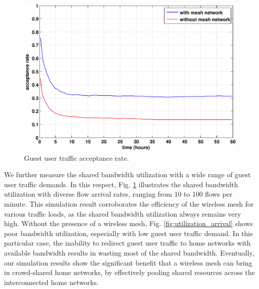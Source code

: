 \begin{figure}[t]
\begin{center}
\includegraphics[width=1\linewidth]{results/acceptance_rate.pdf}
\caption{Guest user traffic acceptance rate.}
\label{fig:acceptance}
\end{center}
\end{figure}

We further measure the shared bandwidth utilization with a wide range of guest user traffic demands. In this respect, Fig. \ref{fig:acceptance} illustrates the shared bandwidth utilization with diverse flow arrival rates, ranging from 10 to 100 flows per minute. This simulation result corroborates the efficiency of the wireless mesh for various traffic loads, as the shared bandwidth utilization always remains very high. Without the presence of a wireless mesh, Fig. \ref{fig:utilization_arrival} shows poor bandwidth utilization, especially with low guest user traffic demand. In this particular case, the inability to redirect guest user traffic to home networks with available bandwidth results in wasting most of the shared bandwidth. Eventually, our simulation results show the significant benefit that a wireless mesh can bring in crowd-shared home networks, by effectively pooling shared resources across the interconnected home networks.

